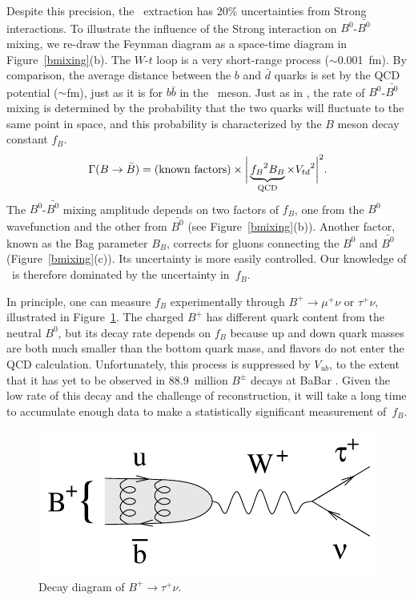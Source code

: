\documentclass{cornell}
\begin{document}
Despite this precision, the \vtd\ extraction has 20\% uncertainties
from Strong interactions.  To illustrate the influence of the Strong
interaction on $B^0$-$\bar{B^0}$ mixing, we re-draw the Feynman
diagram as a space-time diagram in Figure~\ref{bmixing}(b).  The
$W$-$t$ loop is a very short-range process ($\sim$0.001~fm).  By
comparison, the average distance between the $b$ and $\bar{d}$ quarks
is set by the QCD potential ($\sim$fm), just as it is for $b\bar{b}$
in the \ups\ meson.  Just as in \gee, the rate of $B^0$-$\bar{B^0}$
mixing is determined by the probability that the two quarks will
fluctuate to the same point in space, and this probability is
characterized by the $B$ meson decay constant $f_B$.
\begin{equation}
  \Gamma(B \to \bar{B}) = \mbox{(known factors)} \times \bigg|
  \underbrace{{f_B}^2 B_B}_{\mbox{\scriptsize QCD}} \times {V_{td}}^2 \bigg|^2
  \mbox{.}
\end{equation}
The $B^0$-$\bar{B^0}$ mixing amplitude depends on two factors of
$f_B$, one from the $B^0$ wavefunction and the other from $\bar{B^0}$
(see Figure~\ref{bmixing}(b)).  Another factor, known as the Bag
parameter $B_B$, corrects for gluons connecting the $B^0$ and
$\bar{B^0}$ (Figure~\ref{bmixing}(c)).  Its uncertainty is more easily
controlled.  Our knowledge of \vtd\ is therefore dominated by the
uncertainty in~$f_B$.

In principle, one can measure $f_B$ experimentally through $B^+ \to
\mu^+ \nu$ or $\tau^+ \nu$, illustrated in Figure~\ref{btomunu}.  The
charged $B^+$ has different quark content from the neutral $B^0$, but
its decay rate depends on $f_B$ because up and down quark masses are
both much smaller than the bottom quark mass, and flavors do not enter
the QCD calculation.  Unfortunately, this process is suppressed by
$V_{ub}$, to the extent that it has yet to be observed in 88.9~million
$B^\pm$ decays at BaBar \cite{btaunu}.  Given the low rate of this
decay and the challenge of reconstruction, it will take a long time to
accumulate enough data to make a statistically significant measurement
of~$f_B$.

\begin{figure}[p]
  \begin{center}
    \includegraphics[width=0.5\linewidth]{plots/btomunu}
  \end{center}
  \caption[Decay diagram of $B^+ \to \tau^+ \nu$]{\label{btomunu}
  Decay diagram of $B^+ \to \tau^+ \nu$.}
\end{figure}
\end{document}
